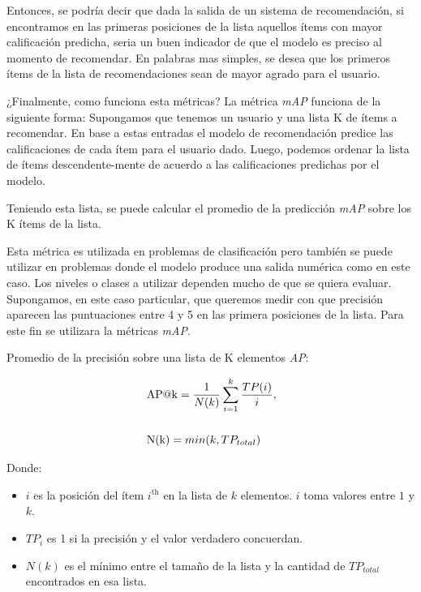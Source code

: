\documentclass[11pt,a4paper,twoside]{thesis}
\begin{document}
Entonces, se podría decir que dada la salida de un sistema de recomendación, si
encontramos en las primeras posiciones de la lista aquellos ítems con mayor
calificación predicha, seria un buen indicador de que el modelo es preciso al
momento de recomendar. En palabras mas simples, se desea que los primeros ítems
de la lista de recomendaciones sean de mayor agrado para el usuario.

¿Finalmente, como funciona esta métricas? La métrica
\textit{mAP\makeatletter@k} funciona de la siguiente forma: Supongamos que tenemos
un usuario y una lista K de ítems a recomendar. En base
a estas entradas el modelo de recomendación predice las calificaciones de cada
ítem para el usuario dado. Luego, podemos ordenar la lista de ítems
descendente-mente de acuerdo a las calificaciones predichas por el modelo.

Teniendo esta lista, se puede calcular el promedio de la predicción
\textit{mAP\makeatletter@k} sobre los K ítems de la lista.

Esta métrica es utilizada en problemas de clasificación pero también se puede
utilizar en problemas donde el modelo produce una salida numérica como en este
caso. Los niveles o clases a utilizar dependen mucho de que se quiera evaluar.
Supongamos, en este caso particular, que queremos medir con que precisión
aparecen las puntuaciones entre 4 y 5 en las primera posiciones de la lista.
Para este fin se utilizara la métricas \textit{mAP\makeatletter@k}.

\begin{description}
	\item[Promedio de la precisión sobre una lista de K elementos
	\textit{AP\makeatletter@k}:]
\end{description}
\begin{equation}
	\begin{split}
		& \operatorname{AP\makeatletter@k}=\frac{1}{N(k)} \sum_{i=1}^k \frac{ TP(i)}{i}, \\
		& \\
		& \operatorname{N(k)} = min(k, TP_{total}) \\
	\end{split}
\end{equation}
\begin{description}
	\item[Donde:]
\end{description}
\begin{itemize}
	\item $i$ es la posición del ítem $i^\mathrm{th}$ en la lista de $k$ elementos. $i$  toma valores entre $1$ y $k$.
	\item $TP_i$ es 1 si la precisión y el valor verdadero concuerdan.
	\item $N(k)$ es el mínimo entre el tamaño de la lista y la cantidad de $TP_{total}$ encontrados en esa lista.
\end{itemize}
\end{document}

